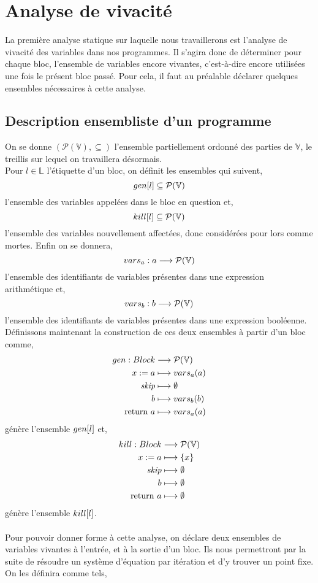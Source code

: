 \documentclass[a4paper, 10pt]{article}
\begin{document}
\section{Analyse de vivacité}
La première analyse statique sur laquelle nous travaillerons est l'analyse de vivacité des variables dans nos programmes. 
Il s'agira donc de déterminer pour chaque bloc, l'ensemble de variables encore vivantes, c'est-à-dire
encore utilisées une fois le présent bloc passé. Pour cela, il faut au préalable déclarer quelques ensembles 
nécessaires à cette analyse.

\subsection{Description ensembliste d'un programme}
On se donne $(\mathcal{P}(\mathbb{V}), \subseteq)$ l'ensemble partiellement ordonné des parties de $\mathbb{V}$, 
le treillis sur lequel on travaillera désormais.
\\
Pour $l \in \mathbb{L}$ l'étiquette d'un bloc, on définit les ensembles qui suivent,
\[gen[l] \subseteq \mathcal{P}(\mathbb{V})\]
l'ensemble des variables appelées dans le bloc en question et,
\[kill[l] \subseteq \mathcal{P}(\mathbb{V})\]
l'ensemble des variables nouvellement affectées, donc considérées pour lors comme mortes. Enfin on se donnera,
\[vars_a : a \longrightarrow \mathcal{P}(\mathbb{V})\]
l'ensemble des identifiants de variables présentes dans une expression arithmétique et,
\[vars_b : b \longrightarrow \mathcal{P}(\mathbb{V})\]
l'ensemble des identifiants de variables présentes dans une expression booléenne.
\\
Définissons maintenant la construction de ces deux ensembles à partir d'un bloc comme,
\begin{align*}
	gen : Block &\longrightarrow \mathcal{P}(\mathbb{V})\\
	{x}\space:=\space{a} &\longmapsto vars_a(a)\\
	\textit{skip} &\longmapsto \emptyset\\
	b &\longmapsto vars_b(b)\\
	\text{return }{a} &\longmapsto vars_a(a)
\end{align*}
génère l'ensemble $gen[l]$ et,
\begin{align*}
	kill : Block &\longrightarrow \mathcal{P}(\mathbb{V})\\
	{x}\space:=\space{a} &\longmapsto \{x\}\\
	\textit{skip} &\longmapsto \emptyset\\
	b &\longmapsto \emptyset\\
	\text{return }{a} &\longmapsto \emptyset
\end{align*}
génère l'ensemble $kill[l]$.
\\
\\
Pour pouvoir donner forme à cette analyse, on déclare deux ensembles de variables vivantes à l'entrée, et à la
sortie d'un bloc. Ils nous permettront par la suite de résoudre un système d'équation par itération et d'y trouver un point fixe. 
On les définira comme tels,
\end{document}
